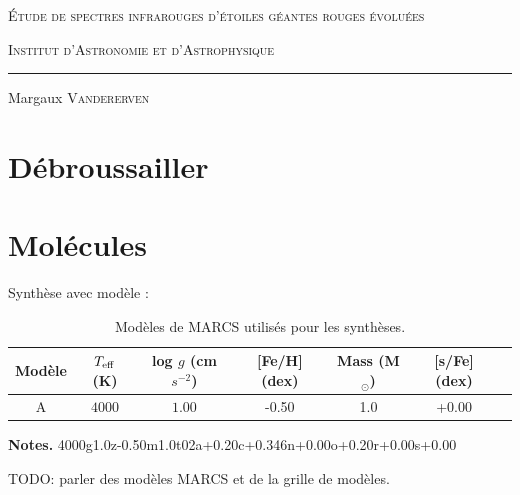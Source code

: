 





\pagestyle{empty}
\vfill

\centering	
	{\LARGE \textsc{Étude de spectres infrarouges d'étoiles géantes rouges évoluées} \par}
	\vspace{0.5cm}
	{\textsc{Institut d'Astronomie et d'Astrophysique}}\par\vspace{0.1cm} \par 
	\rule{0.3\linewidth}{0.4pt} \par
	\vspace{0.5cm}
	Margaux \textsc{Vandererven}\par \vspace{0.7cm} \par 
	\vspace{0.cm}
	
	

\vspace{0.9cm}

\tableofcontents

\clearpage



\section{\sc Débroussailler}


\section{\sc Molécules}

Synthèse avec modèle : 

\begin{table}[h!]
  \begin{center}
  \begin{tabular}{ccccccc}
      \hline
      \hline
      Modèle & $T_{\rm eff}$ (K) & log $g$ (cm $s^{-2}$) & [Fe/H] (dex) & Mass (M$_\odot$) & [s/Fe] (dex)\\
      \hline
      A &  $4000$ & $1.00$ & -0.50 & 1.0& +0.00 \\
      \hline
  \end{tabular}
  \end{center}
  \textbf{Notes.} 4000g1.0z-0.50m1.0t02a+0.20c+0.346n+0.00o+0.20r+0.00s+0.00
  \caption{Modèles de MARCS utilisés pour les synthèses.}
  \label{MARCS}
  \end{table} 
TODO: parler des modèles MARCS et de la grille de modèles.

